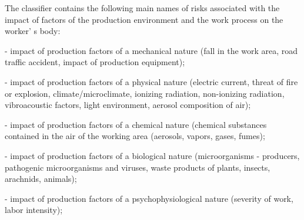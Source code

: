 {%
% 
% 
% 

The classifier contains the following main names of risks associated
with the impact of factors of the production environment and the work
process on the worker' s body:

- impact of production factors of a mechanical nature (fall in the work
area, road traffic accident, impact of production equipment);

- impact of production factors of a physical nature (electric current,
threat of fire or explosion, climate/microclimate, ionizing radiation,
non-ionizing radiation, vibroacoustic factors, light environment,
aerosol composition of air);

- impact of production factors of a chemical nature (chemical substances
contained in the air of the working area (aerosols, vapors, gases,
fumes);

- impact of production factors of a biological nature (microorganisms -
producers, pathogenic microorganisms and viruses, waste products of
plants, insects, arachnids, animals);

- impact of production factors of a psychophysiological nature (severity
of work, labor intensity);

}
